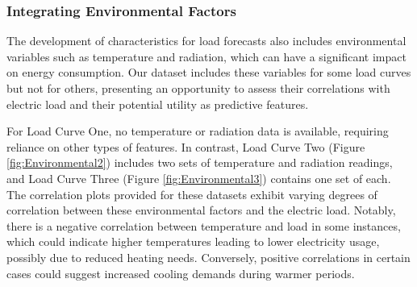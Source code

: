\documentclass{article} %
\begin{document}
\subsubsection{Integrating Environmental Factors}
The development of characteristics for load forecasts also includes environmental variables such as temperature and radiation, which can have a significant impact on energy consumption. Our dataset includes these variables for some load curves but not for others, presenting an opportunity to assess their correlations with electric load and their potential utility as predictive features. 

For Load Curve One, no temperature or radiation data is available, requiring reliance on other types of features. In contrast, Load Curve Two (Figure \ref{fig:Environmental2}) includes two sets of temperature and radiation readings, and Load Curve Three (Figure \ref{fig:Environmental3}) contains one set of each. The correlation plots provided for these datasets exhibit varying degrees of correlation between these environmental factors and the electric load. Notably, there is a negative correlation between temperature and load in some instances, which could indicate higher temperatures leading to lower electricity usage, possibly due to reduced heating needs. Conversely, positive correlations in certain cases could suggest increased cooling demands during warmer periods. 
\end{document}
